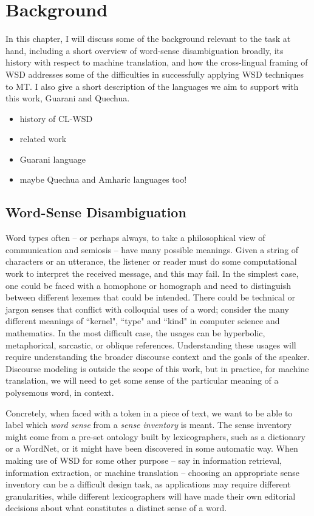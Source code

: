 \chapter{Background}
\label{chap:background}

In this chapter, I will discuss some of the background relevant to the task at
hand, including a short overview of word-sense disambiguation broadly, its
history with respect to machine translation, and how the cross-lingual framing
of WSD addresses some of the difficulties in successfully applying WSD
techniques to MT. I also give a short description of the languages we aim to
support with this work, Guarani and Quechua.

\begin{itemize}
\item history of CL-WSD
\item related work
\item Guarani language
\item maybe Quechua and Amharic languages too!
\end{itemize}

\section{Word-Sense Disambiguation}
Word types often -- or perhaps always, to take a philosophical view of 
communication and semiosis -- have many possible meanings. Given a string of
characters or an utterance, the listener or reader must do some computational
work to interpret the received message, and this may fail.
In the simplest case, one could be faced with
a homophone or homograph and need to distinguish between different lexemes that
could be intended. There could be technical or jargon senses that conflict with
colloquial uses of a word; consider the many different meanings of ``kernel",
``type" and ``kind" in computer science and mathematics. In the most difficult
case, the usages can be hyperbolic, metaphorical, sarcastic, or oblique
references. Understanding these usages will require understanding the broader
discourse context and the goals of the speaker. Discourse modeling is outside
the scope of this work, but in practice, for machine translation, we will need
to get some sense of the particular meaning of a polysemous word, in context.

Concretely, when faced with a token in a piece of text, we want to be able to
label which \emph{word sense} from a \emph{sense inventory} is meant. The sense
inventory might come from a pre-set ontology built by lexicographers, such as a
dictionary or a WordNet, or it might have  been discovered in some automatic
way.
When making use of WSD for some other purpose -- say in information retrieval,
information extraction, or machine translation -- choosing an appropriate sense
inventory can be a difficult design task, as applications may require different
granularities, while different lexicographers will have made their own
editorial decisions about what constitutes a distinct sense of a word.

